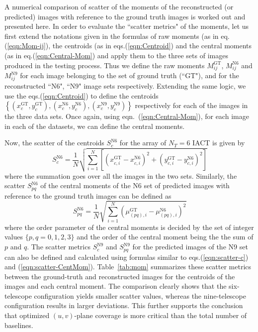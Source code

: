 A numerical comparison of scatter of the moments of the reconstructed (or predicted) images with reference to the ground truth images is worked out and presented here. In order to evaluate the ``scatter metrics" of the moments, let us first extend the notations given in the formulas of raw moments (as in eq.(\ref{eqn:Mom-ij}), the centroids (as in eqs.(\ref{eqn:Centroid}) and the central moments (as in eq.(\ref{eqn:Central-Mom}) and apply them to the three sets of images produced in the testing process. Thus we define the raw moments $M_{ij}^{\mathrm{GT}}$, $M_{ij}^{\mathrm{N6}}$ and $M_{ij}^{\mathrm{N9}}$ for each image belonging to the set of ground truth  (``$\mathrm{GT}$"), and for the reconstructed ``$\mathrm{N6}$", ``$\mathrm{N9}$" image sets respectively. Extending the same logic, we use the eqs.(\ref{eqn:Centroid}) to define the centroids
$\left\{\left(x_c^{\mathrm{GT}}, y_c^{\mathrm{GT}}\right),
\left(x_c^{\mathrm{N6}}, y_c^{\mathrm{N6}}\right),
\left(x_c^{\mathrm{N9}}, y_c^{\mathrm{N9}}\right)\right\}$
respectively for each of the images in the three data sets.
Once again, using eqn.~(\ref{eqn:Central-Mom}), for each image in each of the datasets, we can define the central moments.

Now, the scatter of the centroids $S_c^\mathrm{N6}$ for the array of $N_T=6$ IACT is given by
\begin{equation}
S_c^{\mathrm{N6}} = \frac{1}{N}\sqrt{\sum_{i=1}^N\left[(x_{c,i}^{\mathrm{GT}} - x_{c,i}^{\mathrm{N6}})^2 +(y_{c,i}^{\mathrm{GT}} - y_{c,i}^{\mathrm{N6}})^2 \right]} 
\label{eqn:scatter-c}
\end{equation}    
where the summation goes over all the images in the two sets. Similarly, the scatter $S_{pq}^{\mathrm{N6}}$ of the central moments of the $\mathrm{N6}$ set of predicted images with reference to the ground truth images can be defined as
\begin{equation}
S_{pq}^{\mathrm{N6}} = \frac{1}{N}\sqrt{\sum_{i=1}^N \left(\mu_{(pq),i}^{\mathrm{GT}} - \mu_{(pq),i}^{\mathrm{N6}}\right)^2}
\label{eqn:scatter-CentMom}
\end{equation}
where the order parameter of the central moments is decided by the set of integer values $\{p,q = 0,1,2,3\}$ and the order of the central moment being the the sum of $p$ and $q$. The scatter metrics 
$S_c^\mathrm{N9}$ and $S_{pq}^{\mathrm{N9}}$ for the predicted images of the $\mathrm{N9}$ set can also be defined and calculated using formulas similar to eqs.(\ref{eqn:scatter-c}) and (\ref{eqn:scatter-CentMom}). Table~\ref{tab:mom} summarizes these scatter metrics between the ground-truth and reconstructed images for the centroids of the images and each central moment. The comparison clearly shows that the six-telescope configuration yields smaller scatter values, whereas the nine-telescope configuration results in larger deviations. This further supports the conclusion that optimized $(u,v)$-plane coverage is more critical than the total number of baselines. 

